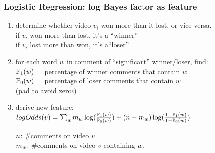 \documentclass[fleqn]{beamer}
\begin{document}
\begin{frame}
\frametitle{Logistic Regression: log Bayes factor as feature}	

      \begin{enumerate}\vspace{2mm}
      \item determine whether video $v_i$ won more than it lost, or vice versa.\\
               if $v_i$ won more than lost, it's a ``winner''\\
               if $v_i$ lost more than won, it's a``loser''
               \vspace{2mm}
      \item for each word $w$ in comment of ``significant'' winner/loser, find: \\
              $\mathbb{P}_1(\mathnormal{w})$ 
             = percentage of winner comments that contain $w$\\
             $\mathbb{P}_0(\mathnormal{w})$ = 
               percentage of loser comments that contain $w$\\
               (pad to avoid zeros)\\
               \vspace{2mm}
      \item derive new feature: \\      
$logOdds(v) =\sum_{\mathnormal{w}} \mathnormal{m_w}\log(\frac{\mathbb{P}_1(\mathnormal{w})}{\mathbb{P}_0(\mathnormal{w})}) + (\mathnormal{n-m_w})\log(\frac{1-\mathbb{P}_1(\mathnormal{w})}{1-\mathbb{P}_0(\mathnormal{w})})$\vspace{3mm}

$\mathnormal{n}$: \#comments on video $v$\\
$\mathnormal{m_w}$: \#comments on video $v$ containing $\mathnormal{w}.$  \vspace{3mm}
      \end{enumerate}

\end{frame}
\end{document}
